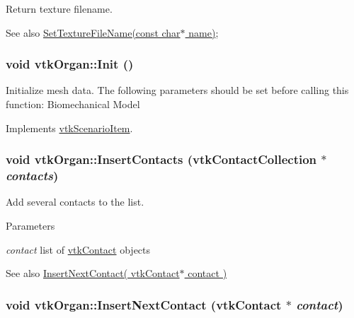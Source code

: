 Return texture filename. \begin{DoxySeeAlso}{See also}
\hyperlink{classvtkOrgan_af19a32e071ae5f9c9848b2ad7088d0c1}{SetTextureFileName(const char$\ast$ name)}; 
\end{DoxySeeAlso}
\hypertarget{classvtkOrgan_a48aa20d7255903b3f7ac5cd2a4adec8c}{
\subsubsection[{Init}]{\setlength{\rightskip}{0pt plus 5cm}void vtkOrgan::Init ()}}
\label{classvtkOrgan_a48aa20d7255903b3f7ac5cd2a4adec8c}


Initialize mesh data. The following parameters should be set before calling this function: Biomechanical Model 

Implements \hyperlink{classvtkScenarioItem_a87f01894de62f23433aa2eb3f995c216}{vtkScenarioItem}.\hypertarget{classvtkOrgan_aa61c5704ac5458ee9e5bfa6aed6014ce}{
\subsubsection[{InsertContacts}]{\setlength{\rightskip}{0pt plus 5cm}void vtkOrgan::InsertContacts ({\bf vtkContactCollection} $\ast$ {\em contacts})}}
\label{classvtkOrgan_aa61c5704ac5458ee9e5bfa6aed6014ce}


Add several contacts to the list. 
\begin{DoxyParams}{Parameters}
\item[{\em contact}]list of \hyperlink{classvtkContact}{vtkContact} objects \end{DoxyParams}
\begin{DoxySeeAlso}{See also}
\hyperlink{classvtkOrgan_aa10b506b56aab4c3b8050c9aaa179c5b}{InsertNextContact( vtkContact$\ast$ contact )} 
\end{DoxySeeAlso}
\hypertarget{classvtkOrgan_aa10b506b56aab4c3b8050c9aaa179c5b}{
\subsubsection[{InsertNextContact}]{\setlength{\rightskip}{0pt plus 5cm}void vtkOrgan::InsertNextContact ({\bf vtkContact} $\ast$ {\em contact})}}
\label{classvtkOrgan_aa10b506b56aab4c3b8050c9aaa179c5b}



